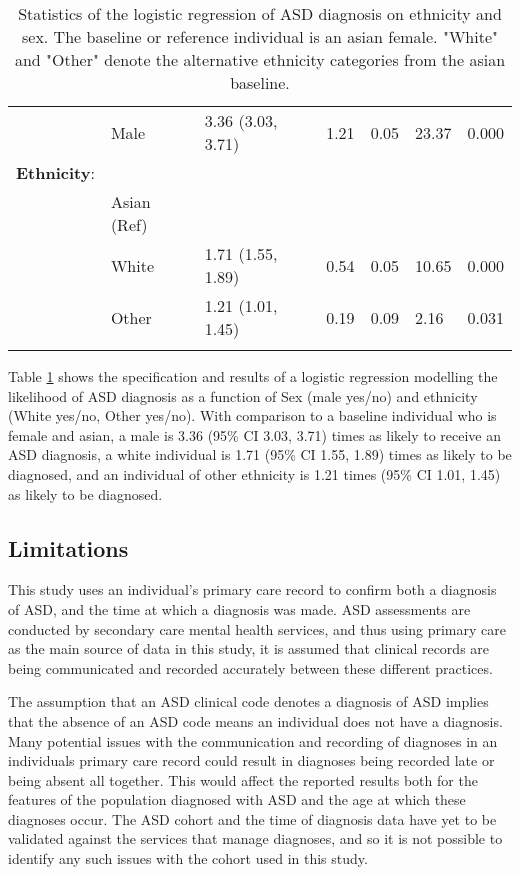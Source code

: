 \documentclass[
]{article}
\begin{document}
\begin{table}[H]
\begin{scriptsize}
\begin{tabular}{lllllll}
& Male & 3.36 (3.03, 3.71) & 1.21 & 0.05 & 23.37 & 0.000 \\
\textbf{Ethnicity}: & & & & & & \\
& Asian (Ref) & & & & & \\
& White & 1.71 (1.55, 1.89) & 0.54 & 0.05 & 10.65 & 0.000 \\
& Other & 1.21 (1.01, 1.45) & 0.19 & 0.09 & 2.16 & 0.031 \\\\
\bottomrule
\end{tabular}
\end{scriptsize}
\caption{Statistics of the logistic regression of ASD diagnosis on ethnicity and sex. The baseline or reference individual is an asian female. "White" and "Other" denote the alternative ethnicity categories from the asian baseline.}
\label{tab:log_reg_results}
\end{table}

Table \ref{tab:log_reg_results} shows the specification and results of a
logistic regression modelling the likelihood of ASD diagnosis as a
function of Sex (male yes/no) and ethnicity (White yes/no, Other
yes/no). With comparison to a baseline individual who is female and
asian, a male is 3.36 (95\% CI 3.03, 3.71) times as likely to receive an
ASD diagnosis, a white individual is 1.71 (95\% CI 1.55, 1.89) times as
likely to be diagnosed, and an individual of other ethnicity is 1.21
times (95\% CI 1.01, 1.45) as likely to be diagnosed.

\hypertarget{limitations}{%
\subsection{Limitations}\label{limitations}}

This study uses an individual's primary care record to confirm both a
diagnosis of ASD, and the time at which a diagnosis was made. ASD
assessments are conducted by secondary care mental health services, and
thus using primary care as the main source of data in this study, it is
assumed that clinical records are being communicated and recorded
accurately between these different practices.

The assumption that an ASD clinical code denotes a diagnosis of ASD
implies that the absence of an ASD code means an individual does not
have a diagnosis. Many potential issues with the communication and
recording of diagnoses in an individuals primary care record could
result in diagnoses being recorded late or being absent all together.
This would affect the reported results both for the features of the
population diagnosed with ASD and the age at which these diagnoses
occur. The ASD cohort and the time of diagnosis data have yet to be
validated against the services that manage diagnoses, and so it is not
possible to identify any such issues with the cohort used in this study.
\end{document}
